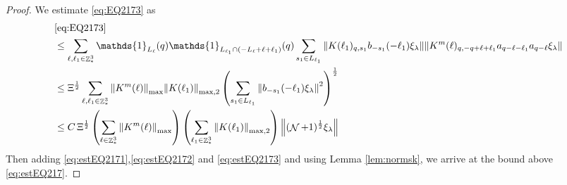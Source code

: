 \documentclass[12pt,a4paper]{article}
\numberwithin{equation}{section}
\newcommand{\1}{\mathbb{I}}
\DeclareMathOperator{\Z}{\mathbb{Z}}
\DeclareMathOperator{\NN}{\mathcal{N}}
\newcommand{\half}{\frac{1}{2}}
\theoremstyle{plain}
\theoremstyle{definition}
\theoremstyle{remark}
\theoremstyle{plain}
\theoremstyle{definition}
\theoremstyle{remark}
\begin{document}
\begin{proof}
We estimate \eqref{eq:EQ2173} as
\begin{align}
	&\eqref{eq:EQ2173}\nonumber\\
	&\leq\sum\limits_{\ell, \ell_1\in \Z^3_*} \mathds{1}_{L_{\ell}}(q) \mathds{1}_{L_{\ell_1}\cap (-L_{\ell}+\ell+\ell_1)}(q) \sum\limits_{s_1\in L_{\ell_1}} \norm{ K(\ell_1)_{q,s_1} b_{-s_1}(-\ell_1) \xi_\lambda}\norm{ K^m(\ell)_{q,-q+\ell+\ell_1} a_{q-\ell-\ell_1} a_{q-\ell} \xi_\lambda }\nonumber\\
	&\leq \Xi^\half \sum\limits_{\ell, \ell_1\in \Z^3_*} \norm{K^m(\ell)}_{\max} \norm{K(\ell_1)}_{\mathrm{max,2}} \left(\sum\limits_{s_1 \in L_{\ell_1}} \norm{ b_{-s_1}(-\ell_1) \xi_\lambda}^2\right)^\half  \nonumber\\ 
	&\leq C\, \Xi^\half \left(\sum\limits_{\ell \in \Z^3_*} \norm{K^m(\ell)}_{\max}\right)\left( \sum\limits_{\ell_1\in \Z^3_*} \norm{ K(\ell_1)}_{\mathrm{max,2}} \right) \norm{(\NN+1)^\half\xi_\lambda}\label{eq:estEQ2173}
\end{align}
Then adding \eqref{eq:estEQ2171},\eqref{eq:estEQ2172} and \eqref{eq:estEQ2173} and using Lemma \ref{lem:normsk}, we arrive at the bound above \eqref{eq:estEQ217}. 
\end{proof}
\end{document}
